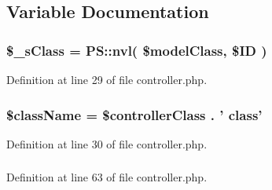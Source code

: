 \subsection{Variable Documentation}
\hypertarget{crud_2controller_8php_a7d53885feef470ba528847a3f2f1f93a}{
\subsubsection[{\$\_\-sClass}]{\setlength{\rightskip}{0pt plus 5cm}\$\_\-sClass = PS::nvl( \$modelClass, \$ID )}}
\label{crud_2controller_8php_a7d53885feef470ba528847a3f2f1f93a}


Definition at line 29 of file controller.php.

\hypertarget{crud_2controller_8php_acd6a475a6eeb092f4eea3e19e502d67d}{
\subsubsection[{\$className}]{\setlength{\rightskip}{0pt plus 5cm}\$className = \$controllerClass . ' class'}}
\label{crud_2controller_8php_acd6a475a6eeb092f4eea3e19e502d67d}


Definition at line 30 of file controller.php.

\hypertarget{crud_2controller_8php_a2c8135527015cd4586959ac7c2ffec92}{
\subsubsection[{HTML}]{}}
\label{crud_2controller_8php_a2c8135527015cd4586959ac7c2ffec92}


Definition at line 63 of file controller.php.


